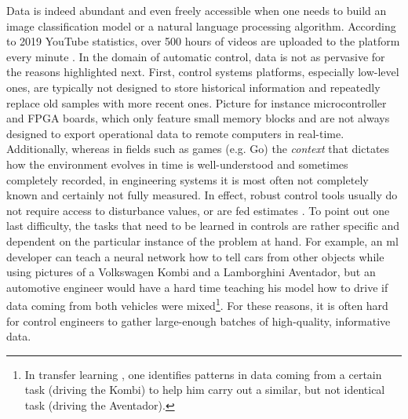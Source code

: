 Data is indeed abundant and even freely accessible when one needs to build an image classification model or a natural language processing algorithm. According to 2019 YouTube statistics, over 500 hours of videos are uploaded to the platform every minute \citep{hale2019}.  
In the domain of automatic control, data is not as pervasive for the reasons highlighted next.
First, control systems platforms, especially low-level ones, are typically not designed to store historical information and repeatedly replace old samples with more recent ones. Picture for instance microcontroller and FPGA boards, which only feature small memory blocks and are not always designed to export operational data to remote computers in real-time. Additionally, whereas in fields such as games (e.g. Go) the \textit{context} that dictates how the environment evolves in time is well-understood and sometimes completely recorded, in engineering systems it is most often not completely known and certainly not fully measured. In effect, robust control tools usually do not require access to disturbance values, or are fed estimates \citep{zhou1998essentials,pannocchia2015offset}. To point out one last difficulty, the tasks that need to be learned in controls are rather specific and dependent on the particular instance of the problem at hand. For example, an \ac{ml} developer can teach a neural network how to tell cars from other objects while using pictures of a Volkswagen Kombi and a Lamborghini Aventador, but an automotive engineer would have a hard time teaching his model how to drive if data coming from both vehicles were mixed\footnote{In transfer learning \citep{pan2010survey}, one identifies patterns in data coming from a certain task (driving the Kombi) to help him carry out a similar, but not identical task (driving the Aventador).}.  For these reasons, it is often hard for control engineers to gather large-enough batches of high-quality, informative data.

